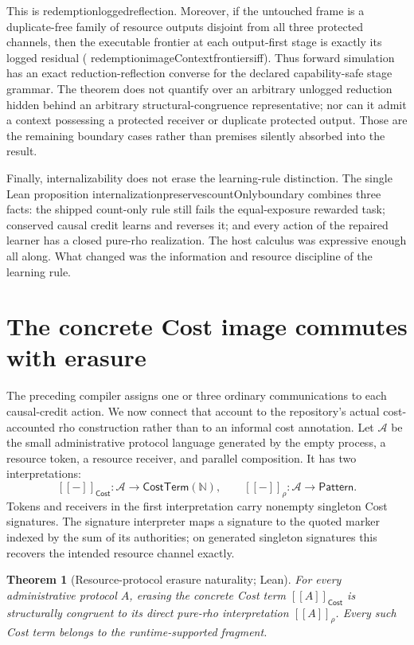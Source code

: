 \documentclass[11pt]{article}
\newtheorem{theorem}{Theorem}[section]
\newcommand{\leanname}[1]{{\scriptsize\ttfamily
  \def\_{\textunderscore\allowbreak}#1}}
\newcommand{\sem}[1]{\left[\!\left[#1\right]\!\right]}
\begin{document}
This is \leanname{redemption\_logged\_reflection}.  Moreover, if the untouched
frame is a duplicate-free family of resource outputs disjoint from all three
protected channels, then the executable frontier at each output-first stage is
exactly its logged residual
(\leanname{redemption\_imageContext\_frontiers\_iff}).  Thus forward
simulation has an exact reduction-reflection converse for the declared
capability-safe stage grammar.  The theorem does not quantify over an
arbitrary unlogged reduction hidden behind an arbitrary structural-congruence
representative; nor can it admit a context possessing a protected receiver or
duplicate protected output.  Those are the remaining boundary cases rather
than premises silently absorbed into the result.

Finally, internalizability does not erase the learning-rule distinction.  The
single Lean proposition
\leanname{internalization\_preserves\_countOnly\_boundary} combines three
facts: the shipped count-only rule still fails the equal-exposure rewarded
task; conserved causal credit learns and reverses it; and every action of the
repaired learner has a closed pure-rho realization.  The host calculus was
expressive enough all along.  What changed was the information and resource
discipline of the learning rule.

\section{The concrete Cost image commutes with erasure}
\label{sec:cost-square}

The preceding compiler assigns one or three ordinary communications to each
causal-credit action.  We now connect that account to the repository's actual
cost-accounted rho construction rather than to an informal cost annotation.
Let \(\mathcal A\) be the small administrative protocol language generated by
the empty process, a resource token, a resource receiver, and parallel
composition.  It has two interpretations:
\[
  \sem{-}_{\mathsf{Cost}} : \mathcal A\to
      \mathsf{CostTerm}(\mathbb N),
  \qquad
  \sem{-}_{\rho} : \mathcal A\to\mathsf{Pattern}.
\]
Tokens and receivers in the first interpretation carry nonempty singleton
Cost signatures.  The signature interpreter maps a signature to the quoted
marker indexed by the sum of its authorities; on generated singleton
signatures this recovers the intended resource channel exactly.

\begin{theorem}[Resource-protocol erasure naturality; Lean]
For every administrative protocol \(A\), erasing the concrete Cost term
\(\sem{A}_{\mathsf{Cost}}\) is structurally congruent to its
direct pure-rho interpretation \(\sem{A}_\rho\).  Every such
Cost term belongs to the runtime-supported fragment.
\end{theorem}
\end{document}

